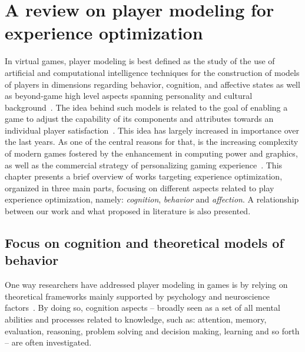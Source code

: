 \chapter{A review on player modeling for experience optimization}\label{ch:review_playing_optimization}
In virtual games, player modeling is best defined as the study of the use of artificial and computational intelligence techniques for the construction of models of players in dimensions regarding behavior, cognition, and affective states as well as beyond-game high level aspects spanning personality and cultural background~\citep{yannakakis_player_2013}. The idea behind such models is related to the goal of enabling a game to adjust the capability of its components and attributes towards an individual player satisfaction~\citep{herik_opponent_2005}. This idea has largely increased in importance over the last years. As one of the central reasons for that, is the increasing complexity of modern games fostered by the enhancement in computing power and graphics, as well as the commercial strategy of personalizing gaming experience~\citep{teng_customization_2010, herik_opponent_2005}. This chapter presents a brief overview of works targeting experience optimization, organized in three main parts, focusing on different aspects related to play experience optimization, namely: \textit{cognition}, \textit{behavior} and \textit{affection}. A relationship between our work and what proposed in literature is also presented.

\section{Focus on cognition and theoretical models of behavior}
One way researchers have addressed player modeling in games is by relying on theoretical frameworks mainly supported by psychology and neuroscience factors~\citep{yannakakis_player_2013}. By doing so, cognition aspects -- broadly seen as a set of all mental abilities and processes related to knowledge, such as: attention, memory, evaluation, reasoning, problem solving and decision making, learning and so forth -- are often investigated. 

